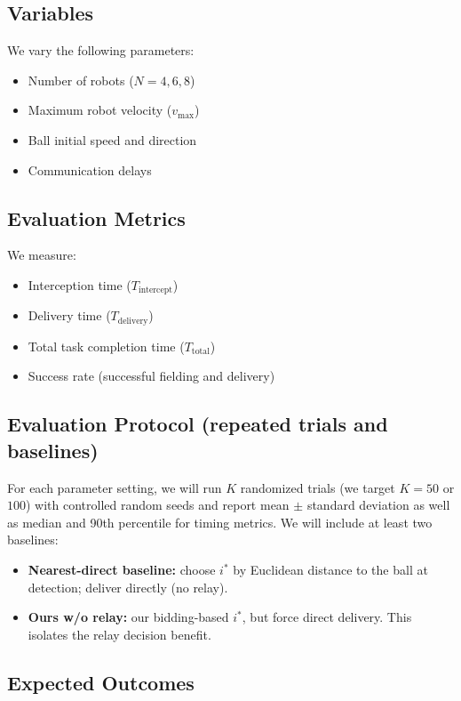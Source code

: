 \documentclass[conference]{IEEEtran}
\begin{document}
\subsection{Variables}

We vary the following parameters:
\begin{itemize}
    \item Number of robots ($N = 4, 6, 8$)
    \item Maximum robot velocity ($v_{\max}$)
    \item Ball initial speed and direction
    \item Communication delays
\end{itemize}

\subsection{Evaluation Metrics}

We measure:
\begin{itemize}
    \item Interception time ($T_{\text{intercept}}$)
    \item Delivery time ($T_{\text{delivery}}$)
    \item Total task completion time ($T_{\text{total}}$)
    \item Success rate (successful fielding and delivery)
\end{itemize}

\subsection{Evaluation Protocol (repeated trials and baselines)}
For each parameter setting, we will run \(K\) randomized trials (we target \(K=50\) or \(100\)) with controlled random seeds and report mean \(\pm\) standard deviation as well as median and 90th percentile for timing metrics. We will include at least two baselines:
\begin{itemize}
    \item \textbf{Nearest-direct baseline:} choose \(i^\ast\) by Euclidean distance to the ball at detection; deliver directly (no relay).
    \item \textbf{Ours w/o relay:} our bidding-based \(i^\ast\), but force direct delivery. This isolates the relay decision benefit.
\end{itemize}

\subsection{Expected Outcomes}
\end{document}
